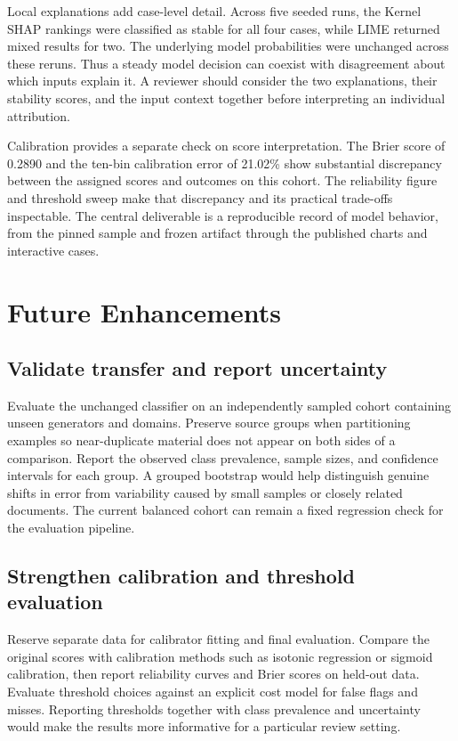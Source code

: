 \documentclass[12pt,oneside]{report}
\begin{document}
Local explanations add case-level detail. Across five seeded runs, the Kernel SHAP rankings were classified as stable for all four cases, while LIME returned mixed results for two. The underlying model probabilities were unchanged across these reruns. Thus a steady model decision can coexist with disagreement about which inputs explain it. A reviewer should consider the two explanations, their stability scores, and the input context together before interpreting an individual attribution.

Calibration provides a separate check on score interpretation. The Brier score of 0.2890 and the ten-bin calibration error of 21.02\% show substantial discrepancy between the assigned scores and outcomes on this cohort. The reliability figure and threshold sweep make that discrepancy and its practical trade-offs inspectable. The central deliverable is a reproducible record of model behavior, from the pinned sample and frozen artifact through the published charts and interactive cases.

\chapter{Future Enhancements}
\section{Validate transfer and report uncertainty}
Evaluate the unchanged classifier on an independently sampled cohort containing unseen generators and domains. Preserve source groups when partitioning examples so near-duplicate material does not appear on both sides of a comparison. Report the observed class prevalence, sample sizes, and confidence intervals for each group. A grouped bootstrap would help distinguish genuine shifts in error from variability caused by small samples or closely related documents. The current balanced cohort can remain a fixed regression check for the evaluation pipeline.

\section{Strengthen calibration and threshold evaluation}
Reserve separate data for calibrator fitting and final evaluation. Compare the original scores with calibration methods such as isotonic regression or sigmoid calibration, then report reliability curves and Brier scores on held-out data. Evaluate threshold choices against an explicit cost model for false flags and misses. Reporting thresholds together with class prevalence and uncertainty would make the results more informative for a particular review setting.
\end{document}
